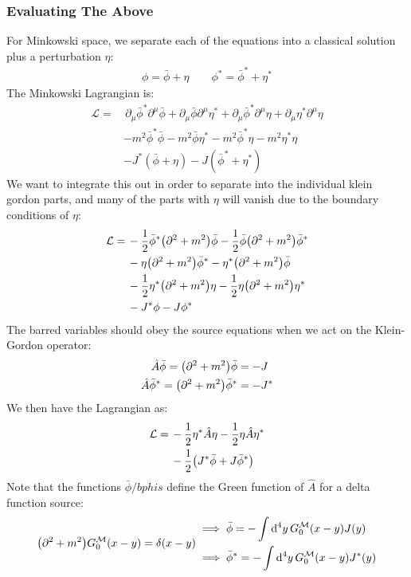 \documentclass[12pt]{article}
\renewcommand{\L}{\mathcal{L}}
\newcommand{\D}{\partial}
\newcommand{\phis}{\phi^*}
\newcommand{\bphis}{\bar{\phi}^*}
\newcommand{\bphi}{\bar{\phi}}
\begin{document}
\subsubsection{Evaluating The Above}
For Minkowski space, we separate each of the equations into a classical solution plus a perturbation $\eta$:
\begin{align*}
  \phi=\bphi+\eta\qquad \phis=\bphis+\eta^*
\end{align*}
The Minkowski Lagrangian is:
\begin{align*}
  \L=&\,\D_\mu\bphis\D^\mu\bphi+\D_\mu\bphi\D^\mu\eta^*+\D_\mu\bphis\D^\mu\eta
  + \D_\mu\eta^*\D^\mu\eta\\
  &-m^2\bphis\bphi-m^2\bphi\eta^*-m^2\bphis\eta-m^2\eta^*\eta\\
  &-J^*(\bphi+\eta)-J(\bphis+\eta^*)
\end{align*}
We want to integrate this out in order to separate into the individual klein gordon parts, and many of the parts with $\eta$ will vanish due to the boundary conditions of $\eta$:
\begin{align*}
  \L=\,&-\frac{1}{2}\bphis\qty(\D^2+m^2)\bphi
  -\frac{1}{2}\bphi\qty(\D^2+m^2)\bphis\\
  &-\eta\qty(\D^2+m^2)\bphis-\eta^*\qty(\D^2+m^2)\bphi\\
  &-\frac{1}{2}\eta^*\qty(\D^2+m^2)\eta-\frac{1}{2}\eta\qty(\D^2+m^2)\eta^*\\
  &-J^*\phi-J\phis
\end{align*}
The barred variables should obey the source equations when we act on the Klein-Gordon operator:
\begin{align*}
  \hat{A}\bphi=\qty(\D^2+m^2)\bphi&=-J\\
  \hat{A}\bphis=\qty(\D^2+m^2)\bphis&=-J^*
\end{align*}
We then have the Lagrangian as:
\begin{align*}
  \L=\,&-\frac{1}{2}\eta^*\hat{A}\eta-\frac{1}{2}\eta\hat{A}\eta^*\\
  &-\frac{1}{2}\qty(J^*\bphi+J\bphis)
\end{align*}
Note that the functions $\bphi/bphis$ define the Green function of $\hat{A}$ for a delta function source:
\begin{equation*}
  \qty(\D^2+m^2)G_0^{\mathcal{M}}(x-y)=\delta(x-y)
  \begin{aligned}
    &\implies\bphi=-\int\dd[4]{y}G_0^{\mathcal{M}}(x-y)J(y)\\
    &\implies\bphis=-\int\dd[4]{y}G_0^{\mathcal{M}}(x-y)J^*(y)
  \end{aligned}
\end{equation*}
\end{document}
